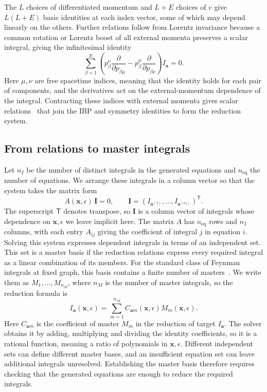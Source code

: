 The $L$ choices of differentiated momentum and $L+E$ choices of $v$ give
$L(L+E)$ basic identities at each index vector, some of which may depend
linearly on the others. Further relations follow from Lorentz invariance
because a common rotation or Lorentz boost of all external momenta
preserves a scalar integral, giving the infinitesimal identity
\begin{equation}
 \sum_{\beta=1}^{E}\left(
 p_\beta^\nu\frac{\partial}{\partial p_{\beta\mu}}
 -p_\beta^\mu\frac{\partial}{\partial p_{\beta\nu}}
 \right) I_{\boldsymbol a}=0.
 \label{eq:li}
\end{equation}
Here $\mu,\nu$ are free spacetime indices, meaning that the identity holds
for each pair of components, and the derivatives act on the
external-momentum dependence of the integral. Contracting these indices
with external momenta gives scalar relations~\cite{GehrmannRemiddi}
that join the IBP and symmetry identities to form the reduction system.

\subsection{From relations to master integrals}
Let $n_I$ be the number of distinct integrals in the generated equations
and $n_{\mathrm{eq}}$ the number of equations. We arrange these integrals
in a column vector so that the system takes the matrix form
\begin{equation}
 A(\boldsymbol x,\epsilon)\,\boldsymbol I=0,
 \qquad
 \boldsymbol I=(I_{\boldsymbol a^{(1)}},\ldots,
 I_{\boldsymbol a^{(n_I)}})^{\mathsf T}.
 \label{eq:matrix}
\end{equation}
The superscript $\mathsf T$ denotes transpose, so $\boldsymbol I$ is a
column vector of integrals whose dependence on $\boldsymbol x,\epsilon$
we leave implicit here. The matrix $A$ has $n_{\mathrm{eq}}$ rows and
$n_I$ columns, with each entry $A_{ij}$ giving the coefficient of integral
$j$ in equation $i$. Solving this system expresses dependent integrals in
terms of an independent set. This set is a master basis if the reduction
relations express every required integral as a linear combination of its
members. For the standard class of Feynman integrals at fixed graph,
this basis contains a finite number
of masters~\cite{SmirnovPetukhov}. We write them as
$M_1,\ldots,M_{n_M}$, where $n_M$ is the number of master integrals, so
the reduction formula is
\begin{equation}
 I_{\boldsymbol a}(\boldsymbol x,\epsilon)
 =\sum_{m=1}^{n_M}C_{\boldsymbol a m}(\boldsymbol x,\epsilon)
 M_m(\boldsymbol x,\epsilon).
 \label{eq:reduction}
\end{equation}
Here $C_{\boldsymbol a m}$ is the coefficient of master $M_m$ in the
reduction of target $I_{\boldsymbol a}$. The solver obtains it by adding,
multiplying and dividing the identity coefficients, so it is a rational
function, meaning a ratio of polynomials in $\boldsymbol x,\epsilon$. Different
independent sets can define different master bases, and an insufficient
equation set can leave additional integrals unresolved. Establishing the
master basis therefore requires checking that the generated equations
are enough to reduce the required integrals.

